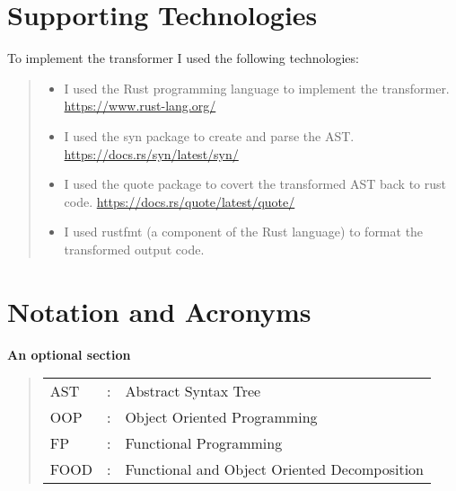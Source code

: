 \documentclass[ oneside,%
                    author={James Elgar},
                    degree={MEng},
                     title={Bidirectional transformer between functional and \\ object-oriented programming in Rust},
                  subtitle={}]{dissertation}
\begin{document}
\chapter*{Supporting Technologies}

\noindent
To implement the transformer I used the following technologies:

\begin{quote}
\noindent
\begin{itemize}
\item I used the Rust programming language to implement the transformer. \url{https://www.rust-lang.org/}
\item I used the syn package to create and parse the AST. \url{https://docs.rs/syn/latest/syn/}
\item I used the quote package to covert the transformed AST back to rust code. \url{https://docs.rs/quote/latest/quote/}
\item I used rustfmt (a component of the Rust language) to format the transformed output code.
\end{itemize}
\end{quote}


\chapter*{Notation and Acronyms}

{\bf An optional section}
\vspace{1cm} 

\noindent


\begin{quote}
\noindent
\begin{tabular}{lcl}
AST                 &:     & Abstract Syntax Tree                                        \\
OOP                 &:     & Object Oriented Programming                                 \\
FP                  &:     & Functional Programming                                      \\
FOOD                &:     & Functional and Object Oriented Decomposition                \\
\end{tabular}
\end{quote}
\end{document}
